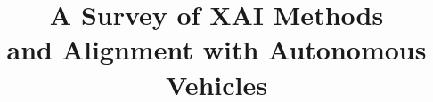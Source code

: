 \documentclass{IEEEtran}
\begin{document}
\title{A Survey of XAI Methods\\and Alignment with Autonomous Vehicles}
\author{
    \\
}
\maketitle









\nocite{*}

 
\end{document}

